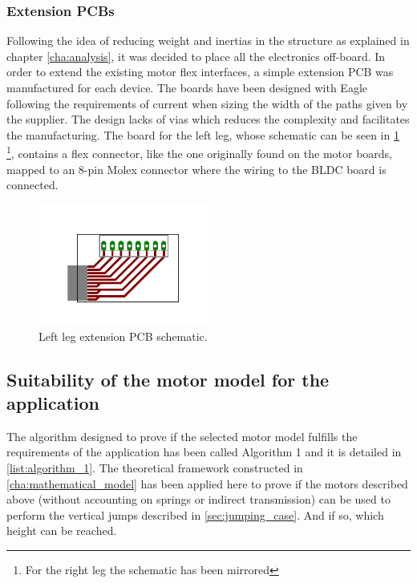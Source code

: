 
\subsubsection{Extension PCBs} %
\label{ssub:extension_pcbs}
Following the idea of reducing weight and inertias in the structure as explained in chapter \ref{cha:analysis}, it was decided to place all the electronics off-board.
In order to extend the existing motor flex interfaces, a simple extension PCB was manufactured for each device.
The boards have been designed with Eagle following the requirements of current when sizing the width of the paths given by the supplier.
The design lacks of vias which reduces the complexity and facilitates the manufacturing.
The board for the left leg, whose schematic can be seen in \ref{fig:pcb1} \footnote{For the right leg the schematic has been mirrored}, contains a flex connector, like the one originally found on the motor boards, mapped to an 8-pin Molex connector where the wiring to the BLDC board is connected.

\begin{figure}[ht]
	\centering
	\includegraphics[width=0.5\textwidth]{figures/expansion_board.pdf}
	\caption{Left leg extension PCB schematic.}
	\label{fig:pcb1}
\end{figure}



\subsection{Suitability of the motor model for the application} %
\label{sub:suitability_of_the_motor_model_for_the_application}
The algorithm designed to prove if the selected motor model fulfills the requirements of the application has been called Algorithm 1 and it is detailed in \ref{list:algorithm_1}.
The theoretical framework constructed in \ref{cha:mathematical_model} has been applied here to prove if the motors described above (without accounting on springs or indirect transmission) can be used to perform the vertical jumps described in \ref{sec:jumping_case}.
And if so, which height can be reached.

